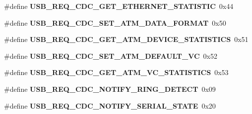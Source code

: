 \begin{DoxyCompactItemize}
\item 
\hypertarget{group__cdc__protocol__group_gaa035e847093134f53d71bd46d346a7fc}{\#define {\bfseries U\-S\-B\-\_\-\-R\-E\-Q\-\_\-\-C\-D\-C\-\_\-\-G\-E\-T\-\_\-\-E\-T\-H\-E\-R\-N\-E\-T\-\_\-\-S\-T\-A\-T\-I\-S\-T\-I\-C}~0x44}\label{group__cdc__protocol__group_gaa035e847093134f53d71bd46d346a7fc}

\item 
\hypertarget{group__cdc__protocol__group_ga95ef1719d5a884fec7ee4c2d7db80d82}{\#define {\bfseries U\-S\-B\-\_\-\-R\-E\-Q\-\_\-\-C\-D\-C\-\_\-\-S\-E\-T\-\_\-\-A\-T\-M\-\_\-\-D\-A\-T\-A\-\_\-\-F\-O\-R\-M\-A\-T}~0x50}\label{group__cdc__protocol__group_ga95ef1719d5a884fec7ee4c2d7db80d82}

\item 
\hypertarget{group__cdc__protocol__group_ga51a6c3496ca4f926d0401126e3e9aee6}{\#define {\bfseries U\-S\-B\-\_\-\-R\-E\-Q\-\_\-\-C\-D\-C\-\_\-\-G\-E\-T\-\_\-\-A\-T\-M\-\_\-\-D\-E\-V\-I\-C\-E\-\_\-\-S\-T\-A\-T\-I\-S\-T\-I\-C\-S}~0x51}\label{group__cdc__protocol__group_ga51a6c3496ca4f926d0401126e3e9aee6}

\item 
\hypertarget{group__cdc__protocol__group_gabb6d36ab906dfa74e80b42e7d87660ee}{\#define {\bfseries U\-S\-B\-\_\-\-R\-E\-Q\-\_\-\-C\-D\-C\-\_\-\-S\-E\-T\-\_\-\-A\-T\-M\-\_\-\-D\-E\-F\-A\-U\-L\-T\-\_\-\-V\-C}~0x52}\label{group__cdc__protocol__group_gabb6d36ab906dfa74e80b42e7d87660ee}

\item 
\hypertarget{group__cdc__protocol__group_ga84ff24c8cbc01c595db2ba129640befb}{\#define {\bfseries U\-S\-B\-\_\-\-R\-E\-Q\-\_\-\-C\-D\-C\-\_\-\-G\-E\-T\-\_\-\-A\-T\-M\-\_\-\-V\-C\-\_\-\-S\-T\-A\-T\-I\-S\-T\-I\-C\-S}~0x53}\label{group__cdc__protocol__group_ga84ff24c8cbc01c595db2ba129640befb}

\item 
\hypertarget{group__cdc__protocol__group_gab920e7b71fb8698431c35cef60126777}{\#define {\bfseries U\-S\-B\-\_\-\-R\-E\-Q\-\_\-\-C\-D\-C\-\_\-\-N\-O\-T\-I\-F\-Y\-\_\-\-R\-I\-N\-G\-\_\-\-D\-E\-T\-E\-C\-T}~0x09}\label{group__cdc__protocol__group_gab920e7b71fb8698431c35cef60126777}

\item 
\hypertarget{group__cdc__protocol__group_ga55b0f0c908d50cb9aa8553a17f118e12}{\#define {\bfseries U\-S\-B\-\_\-\-R\-E\-Q\-\_\-\-C\-D\-C\-\_\-\-N\-O\-T\-I\-F\-Y\-\_\-\-S\-E\-R\-I\-A\-L\-\_\-\-S\-T\-A\-T\-E}~0x20}\label{group__cdc__protocol__group_ga55b0f0c908d50cb9aa8553a17f118e12}


\end{DoxyCompactItemize}
